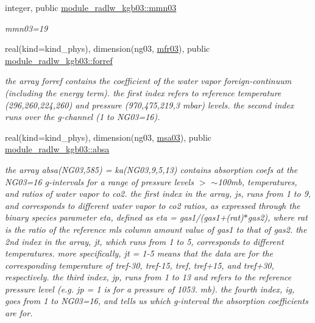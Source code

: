 \begin{DoxyCompactItemize}
integer, public \hyperlink{group__module__radlw__kgbnn_gab4e84b10460930267256c0e5a1fe7a55}{module\+\_\+radlw\+\_\+kgb03\+::mmn03}
\begin{DoxyCompactList}\small\item\em mmn03=19 \end{DoxyCompactList}\item 
\mbox{\label{group__module__radlw__kgbnn_gafcc55fa81ba6369b56d29db2342c2e6a}} 
real(kind=kind\+\_\+phys), dimension(ng03, \hyperlink{group__module__radlw__kgbnn_ga4ea1e58a39585adc087718b92a16b529}{mfr03}), public \hyperlink{group__module__radlw__kgbnn_gafcc55fa81ba6369b56d29db2342c2e6a}{module\+\_\+radlw\+\_\+kgb03\+::forref}
\begin{DoxyCompactList}\small\item\em the array forref contains the coefficient of the water vapor foreign-\/continuum (including the energy term). the first index refers to reference temperature (296,260,224,260) and pressure (970,475,219,3 mbar) levels. the second index runs over the g-\/channel (1 to N\+G03=16). \end{DoxyCompactList}\item 
\mbox{\label{group__module__radlw__kgbnn_gac65fd4afedbd4bfa2c87c5e4f060a1d4}} 
real(kind=kind\+\_\+phys), dimension(ng03, \hyperlink{namespacemodule__radlw__kgb03_a78658032153f7a4cbeaa198cbe661244}{msa03}), public \hyperlink{group__module__radlw__kgbnn_gac65fd4afedbd4bfa2c87c5e4f060a1d4}{module\+\_\+radlw\+\_\+kgb03\+::absa}
\begin{DoxyCompactList}\small\item\em the array absa(\+N\+G03,585) = ka(\+N\+G03,9,5,13) contains absorption coefs at the N\+G03=16 g-\/intervals for a range of pressure levels $>$ $\sim$100mb, temperatures, and ratios of water vapor to co2. the first index in the array, js, runs from 1 to 9, and corresponds to different water vapor to co2 ratios, as expressed through the binary species parameter eta, defined as eta = gas1/(gas1+(rat)$\ast$gas2), where rat is the ratio of the reference mls column amount value of gas1 to that of gas2. the 2nd index in the array, jt, which runs from 1 to 5, corresponds to different temperatures. more specifically, jt = 1-\/5 means that the data are for the corresponding temperature of tref-\/30, tref-\/15, tref, tref+15, and tref+30, respectively. the third index, jp, runs from 1 to 13 and refers to the reference pressure level (e.\+g. jp = 1 is for a pressure of 1053. mb). the fourth index, ig, goes from 1 to N\+G03=16, and tells us which g-\/interval the absorption coefficients are for. \end{DoxyCompactList}\item 

\end{DoxyCompactItemize}
